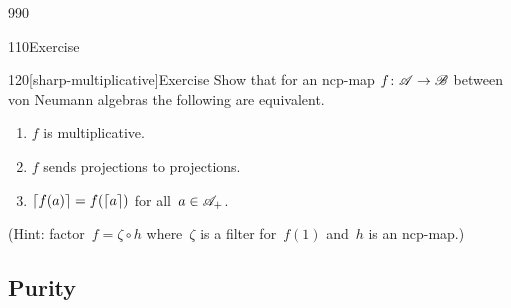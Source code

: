 \begin{parsec}{990}
\begin{point}{110}{Exercise}
\end{point}
\begin{point}{120}[sharp-multiplicative]{Exercise}%
Show that for an ncp-map $f\colon \mathscr{A}\to\mathscr{B}$
between von Neumann algebras
the following are equivalent.
\begin{enumerate}
\item
$f$ is multiplicative.
\item
$f$ sends projections to projections.
\item
$\left\lceil f(a)\right\rceil=f(\left\lceil a\right\rceil)$
for all~$a \in\mathscr{A}_+$.
\end{enumerate}
(Hint: factor~$f=\zeta \circ h$
where~$\zeta$ is a filter for~$f(1)$
and~$h$ is an ncp-map.)
\end{point}
\end{parsec}
\subsection{Purity}
